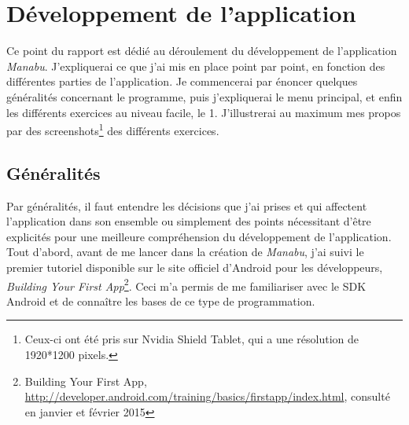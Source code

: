 \section{Développement de l'application}
Ce point du rapport est dédié au déroulement du développement de l'application \textit{Manabu}. J'expliquerai ce que j'ai mis en place point par point, en fonction des différentes parties de l'application. Je commencerai par énoncer quelques généralités concernant le programme, puis j'expliquerai le menu principal, et enfin les différents exercices au niveau facile, le 1. J'illustrerai au maximum mes propos par des screenshots\footnote{Ceux-ci ont été pris sur Nvidia Shield Tablet, qui a une résolution de 1920*1200 pixels.} des différents exercices.

\subsection{Généralités}
Par généralités, il faut entendre les décisions que j'ai prises et qui affectent l'application dans son ensemble ou simplement des points nécessitant d'être explicités pour une meilleure compréhension du développement de l'application.\\

Tout d'abord, avant de me lancer dans la création de \textit{Manabu}, j'ai suivi le premier tutoriel disponible sur le site officiel d'Android pour les développeurs, \textit{Building Your First App}\footnote{Building Your First App, \url{http://developer.android.com/training/basics/firstapp/index.html}, consulté en janvier et février 2015}. Ceci m'a permis de me familiariser avec le SDK Android et de connaître les bases de ce type de programmation.\\

